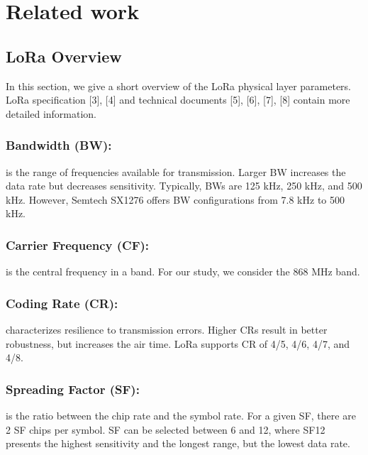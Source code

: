 \section{Related work} \label{sec:Related work}

\subsection{LoRa Overview}
In this section,
	we give a short overview of the LoRa physical layer parameters.
LoRa specification [3],
	[4] and technical documents [5],
	[6],
	[7],
	[8] contain more detailed information.

\subsubsection{Bandwidth (BW):}
	is the range of frequencies available for transmission.
Larger BW increases the data rate but decreases sensitivity.
Typically,
	BWs are 125 kHz, 250 kHz,
	and 500 kHz.
However,
	Semtech SX1276 offers BW configurations from 7.8 kHz to 500 kHz.

\subsubsection{Carrier Frequency (CF):}
	is the central frequency in a band.
For our study,
	we consider the 868 MHz band.

\subsubsection{Coding Rate (CR):}
characterizes resilience to transmission errors.
Higher CRs result in better robustness,
	but increases the air time.
LoRa supports CR of 4/5, 4/6, 4/7, and 4/8.

\subsubsection{Spreading Factor (SF):}
is the ratio between the chip rate and the symbol rate.
For a given SF,
	there are 2 SF chips per symbol.
SF can be selected between 6 and 12,
	where SF12 presents the highest sensitivity and the longest range,
	but the lowest data rate.

